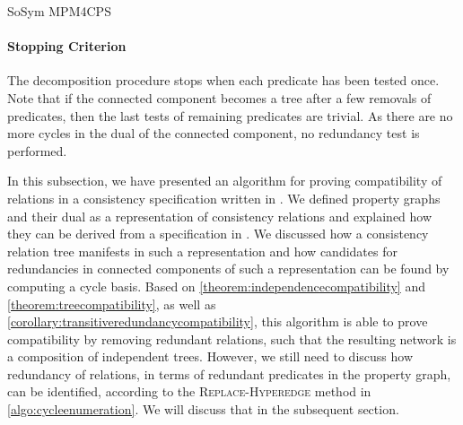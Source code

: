\begin{copiedFrom}{SoSym MPM4CPS}
\paragraph{Stopping Criterion}
The decomposition procedure stops when each predicate has been tested once. Note that if the connected component becomes a tree after a few removals of predicates, then the last tests of remaining predicates are trivial. As there are no more cycles in the dual of the connected component, no redundancy test is performed.

In this subsection, we have presented an algorithm for proving compatibility of relations in a consistency specification written in \qvtr.
We defined property graphs and their dual as a representation of consistency relations and explained how they can be derived from a specification in \qvtr.
We discussed how a consistency relation tree manifests in such a representation and how candidates for redundancies in connected components of such a representation can be found by computing a cycle basis.
Based on \autoref{theorem:independencecompatibility} and \autoref{theorem:treecompatibility}, as well as \autoref{corollary:transitiveredundancycompatibility}, this algorithm is able to prove compatibility by removing redundant relations, such that the resulting network is a composition of independent trees.
However, we still need to discuss how redundancy of relations, in terms of redundant predicates in the property graph, can be identified, according to the \textsc{Replace-Hyperedge} method in \autoref{algo:cycleenumeration}.
We will discuss that in the subsequent section.



\end{copiedFrom}
